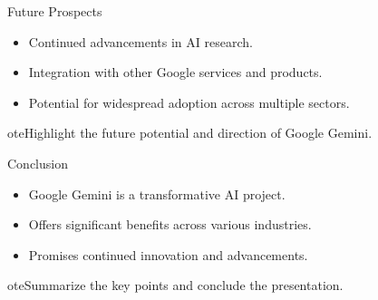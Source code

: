 \documentclass{beamer}
\begin{document}
\begin{frame}{Future Prospects}
  \begin{itemize}
    \item Continued advancements in AI research.
    \item Integration with other Google services and products.
    \item Potential for widespread adoption across multiple sectors.
  \end{itemize}
  
ote{Highlight the future potential and direction of Google Gemini.}
\end{frame}

\begin{frame}{Conclusion}
  \begin{itemize}
    \item Google Gemini is a transformative AI project.
    \item Offers significant benefits across various industries.
    \item Promises continued innovation and advancements.
  \end{itemize}
  
ote{Summarize the key points and conclude the presentation.}
\end{frame}
\end{document}

